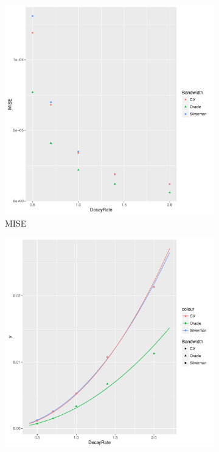 \begin{figure}[htbp]
    \centering
    \begin{subfigure}[b]{0.3\textwidth}
    \includegraphics[width=\textwidth]{results/by_cases_decay/MISE-vs-risk-decay}
    \caption{MISE}
    \end{subfigure}
    \begin{subfigure}[b]{0.3\textwidth}
    \includegraphics[width=\textwidth]{results/by_cases_decay/RMISE-vs-risk-decay}

\end{subfigure}
\end{figure}
